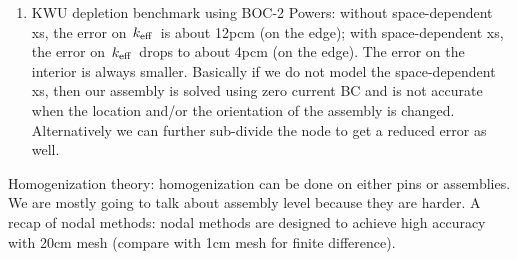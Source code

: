 \documentclass{school-22.211-notes}
\begin{document}
\begin{enumerate}
\item KWU depletion benchmark using BOC-2 Powers: without space-dependent xs, the error on $\left. k_{\mathrm{eff}} \right.$ is about 12pcm (on the edge); with space-dependent xs, the error on $\left. k_{\mathrm{eff}} \right.$ drops to about 4pcm (on the edge). The error on the interior is always smaller. Basically if we do not model the space-dependent xs, then our assembly is solved using zero current BC and is not accurate when the location and/or the orientation of the assembly is changed. Alternatively we can further sub-divide the node to get a reduced error as well. 
\end{enumerate}

\clearpage
{}
Homogenization theory: homogenization can be done on either pins or assemblies. We are mostly going to talk about assembly level because they are harder. A recap of nodal methods: nodal methods are designed to achieve high accuracy with 20cm mesh (compare with 1cm mesh for finite difference). 
\end{document}
